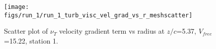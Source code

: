 \begin{figure}[H]
\centering
\texttt{[image: figs/run\_1/run\_1\_turb\_visc\_vel\_grad\_vs\_r\_meshscatter]}
\caption{Scatter plot of $\nu_T$ velocity gradient term vs radius at $z/c$=5.37, $V_{free}$=15.22, station 1.}
\label{fig:run_1_turb_visc_vel_grad_vs_r_meshscatter}
\end{figure}


